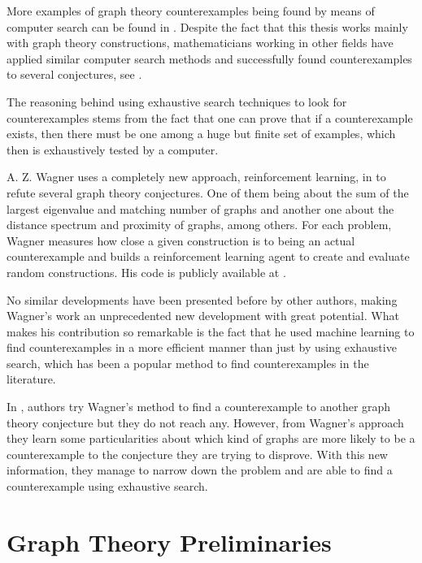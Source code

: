 \documentclass[11pt]{article}
\theoremstyle{definition}
\begin{document}
More examples of graph theory counterexamples being found by means of computer search can be found in \cite{Goedgebeur, FranceticHerkeMckayWanless, GaoMckayNaserasrStevens}. Despite the fact that this thesis works mainly with graph theory constructions, mathematicians working in other fields have applied similar computer search methods and successfully found counterexamples to several conjectures, see \cite{Mitrea:Tucker, Odlyzko:Riele, Lander:Parkin}. 

The reasoning behind using exhaustive search techniques to look for counterexamples stems from the fact that one can  prove that if a counterexample exists, then there must be one among a huge but finite set of examples, which then is exhaustively tested by a computer.

A. Z. Wagner uses a completely new approach, reinforcement learning, in \cite{Wagner:2021} to refute several graph theory conjectures. One of them being about the sum of the largest eigenvalue and matching number of graphs and another one about the distance spectrum and proximity of graphs, among others. For each problem, Wagner measures how close a given construction is to being an actual counterexample and builds a reinforcement learning agent to create and evaluate random constructions. His code is publicly available at \cite{GithubWagner}.

No similar developments have been presented before by other authors, making Wagner's work an unprecedented new development with great potential. What makes his contribution so remarkable is the fact that he used machine learning to find counterexamples in a more efficient manner than just by using exhaustive search, which has been a popular method to find counterexamples in the literature.

In \cite{Stevanovic}, authors try Wagner's method to find a counterexample to another graph theory conjecture but they do not reach any. However, from Wagner's approach they learn some particularities about which kind of graphs are more likely to be a counterexample to the conjecture they are trying to disprove. With this new information, they manage to narrow down the problem and are able to find a counterexample using exhaustive search.

\newpage

\section{Graph Theory Preliminaries} \label{graph theory}
\end{document}
